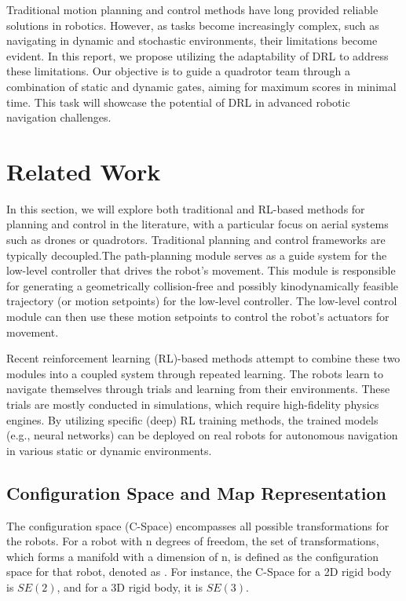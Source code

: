 Traditional motion planning and control methods have long provided reliable solutions in robotics. However, as tasks become increasingly complex, such as navigating in dynamic and stochastic environments, their limitations become evident. In this report, we propose utilizing the adaptability of DRL to address these limitations. Our objective is to guide a quadrotor team through a combination of static and dynamic gates, aiming for maximum scores in minimal time. This task will showcase the potential of DRL in advanced robotic navigation challenges.

\section{Related Work}
In this section, we will explore both traditional and RL-based methods for planning and control in the literature, with a particular focus on aerial systems such as drones or quadrotors. Traditional planning and control frameworks are typically decoupled.The path-planning module serves as a guide system for the low-level controller that drives the robot's movement. This module is responsible for generating a geometrically collision-free and possibly kinodynamically feasible trajectory (or motion setpoints) for the low-level controller. The low-level control module can then use these motion setpoints to control the robot's actuators for movement.

Recent reinforcement learning (RL)-based methods attempt to combine these two modules into a coupled system through repeated learning. The robots learn to navigate themselves through trials and learning from their environments. These trials are mostly conducted in simulations, which require high-fidelity physics engines. By utilizing specific (deep) RL training methods, the trained models (e.g., neural networks) can be deployed on real robots for autonomous navigation in various static or dynamic environments.

\subsection{Configuration Space and Map Representation}
The configuration space (C-Space) encompasses all possible transformations for the robots. For a robot with n degrees of freedom, the set of transformations, which forms a manifold with a dimension of n, is defined as the configuration space for that robot, denoted as \robotConfig \cite{quan2020survey}. For instance, the C-Space for a 2D rigid body is $SE(2)$, and for a 3D rigid body, it is $SE(3)$.

